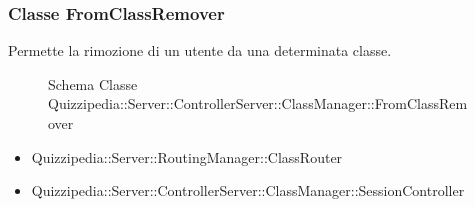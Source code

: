 \subsubsection{Classe FromClassRemover}
Permette la rimozione di un utente da una determinata classe.
\begin{figure}[H]
\centering
\noindent{}
\caption[Schema Classe FromClassRemover]{Schema Classe Quizzipedia::Server::ControllerServer::ClassManager::FromClassRemover}
\end{figure}
\begin{itemize}
\item Quizzipedia::Server::RoutingManager::ClassRouter
\end{itemize}
\begin{itemize}
\item Quizzipedia::Server::ControllerServer::ClassManager::SessionController
\end{itemize}
